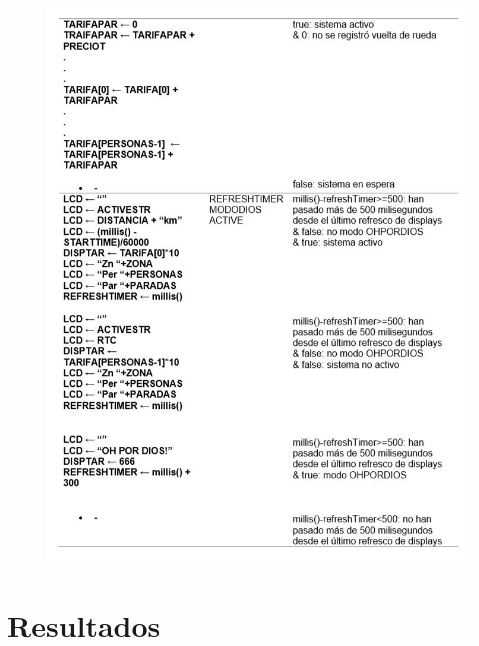 \documentclass[a4paper,11pt]{article}
\begin{document}
	\newpage
	\begin{figure}[h]
		\centering
		\includegraphics{images/tabla3.jpg}
		\end{figure}
	


\section*{Resultados}
\end{document}
